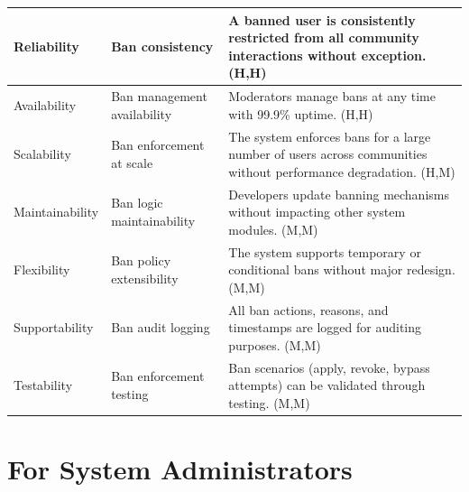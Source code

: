 \documentclass{article}
\begin{document}
\begin{table}[H]
\begin{tabular}{|p{3cm}|p{4cm}|p{7cm}|}
        Reliability
                                   & Ban consistency
                                   & A banned user is consistently restricted from all community interactions without exception. (H,H)                                   \\
        \hline

        Availability
                                   & Ban management availability
                                   & Moderators manage bans at any time with 99.9\% uptime. (H,H)                                                                        \\
        \hline

        Scalability
                                   & Ban enforcement at scale
                                   & The system enforces bans for a large number of users across communities without performance degradation. (H,M)                      \\
        \hline

        Maintainability
                                   & Ban logic maintainability
                                   & Developers update banning mechanisms without impacting other system modules. (M,M)                                                  \\
        \hline

        Flexibility
                                   & Ban policy extensibility
                                   & The system supports temporary or conditional bans without major redesign. (M,M)                                                     \\
        \hline

        Supportability
                                   & Ban audit logging
                                   & All ban actions, reasons, and timestamps are logged for auditing purposes. (M,M)                                                    \\
        \hline

        Testability
                                   & Ban enforcement testing
                                   & Ban scenarios (apply, revoke, bypass attempts) can be validated through testing. (M,M)                                              \\
        \hline
    \end{tabular}
\end{table}

\section{For System Administrators}
\end{document}
